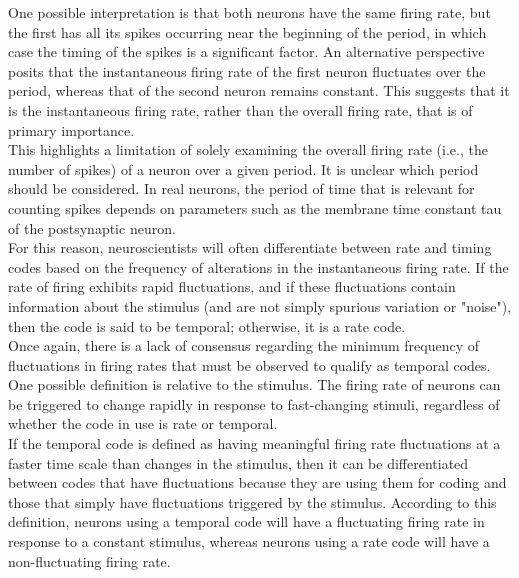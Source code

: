 \noindent One possible interpretation is that both neurons have the same firing rate, but the first has all its spikes occurring near the beginning of the period, in which case the timing of the spikes is a significant factor. An alternative perspective posits that the instantaneous firing rate of the first neuron fluctuates over the period, whereas that of the second neuron remains constant. This suggests that it is the instantaneous firing rate, rather than the overall firing rate, that is of primary importance. \\

\noindent This highlights a limitation of solely examining the overall firing rate (i.e., the number of spikes) of a neuron over a given period. It is unclear which period should be considered. In real neurons, the period of time that is relevant for counting spikes depends on parameters such as the membrane time constant tau of the postsynaptic neuron. \\

\noindent For this reason, neuroscientists will often differentiate between rate and timing codes based on the frequency of alterations in the instantaneous firing rate. If the rate of firing exhibits rapid fluctuations, and if these fluctuations contain information about the stimulus (and are not simply spurious variation or "noise"), then the code is said to be temporal; otherwise, it is a rate code. \\

\noindent Once again, there is a lack of consensus regarding the minimum frequency of fluctuations in firing rates that must be observed to qualify as temporal codes. One possible definition is relative to the stimulus. The firing rate of neurons can be triggered to change rapidly in response to fast-changing stimuli, regardless of whether the code in use is rate or temporal. \\

\noindent If the temporal code is defined as having meaningful firing rate fluctuations at a faster time scale than changes in the stimulus, then it can be differentiated between codes that have fluctuations because they are using them for coding and those that simply have fluctuations triggered by the stimulus. According to this definition, neurons using a temporal code will have a fluctuating firing rate in response to a constant stimulus, whereas neurons using a rate code will have a non-fluctuating firing rate. \\

